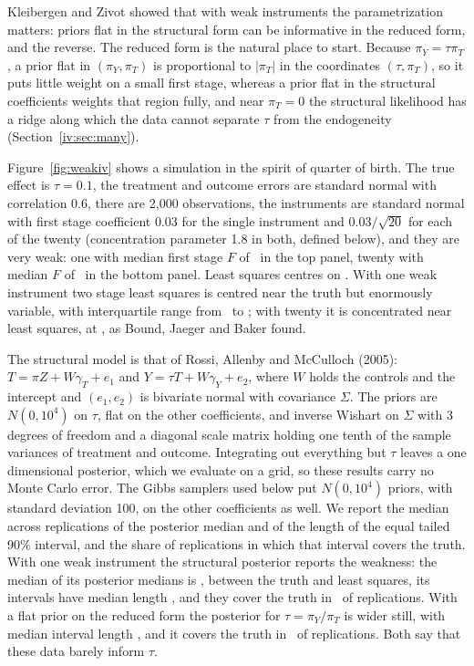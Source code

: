 Kleibergen and Zivot showed that with weak instruments the parametrization matters: priors flat in the structural form can be informative in the reduced form, and the reverse. The reduced form is the natural place to start. Because $\pi_Y = \tau\pi_T$, a prior flat in $(\pi_Y, \pi_T)$ is proportional to $|\pi_T|$ in the coordinates $(\tau, \pi_T)$, so it puts little weight on a small first stage, whereas a prior flat in the structural coefficients weights that region fully, and near $\pi_T = 0$ the structural likelihood has a ridge along which the data cannot separate $\tau$ from the endogeneity (Section~\ref{iv:sec:many}).

Figure~\ref{fig:weakiv} shows a simulation in the spirit of quarter of birth. The true effect is $\tau = 0.1$, the treatment and outcome errors are standard normal with correlation $0.6$, there are 2{,}000 observations, the instruments are standard normal with first stage coefficient $0.03$ for the single instrument and $0.03/\sqrt{20}$ for each of the twenty (concentration parameter 1.8 in both, defined below), and they are very weak: one with median first stage $F$ of \ivweakF\ in the top panel, twenty with median $F$ of \ivmanyF\ in the bottom panel. Least squares centres on \ivweakols. With one weak instrument two stage least squares is centred near the truth but enormously variable, with interquartile range from \ivweakiqrlo\ to \ivweakiqrhi; with twenty it is concentrated near least squares, at \ivmanytsls, as Bound, Jaeger and Baker found.

 The structural model is that of Rossi, Allenby and McCulloch (2005): $T = \pi Z + W\gamma_T + e_1$ and $Y = \tau T + W\gamma_Y + e_2$, where $W$ holds the controls and the intercept and $(e_1, e_2)$ is bivariate normal with covariance $\Sigma$. The priors are $N(0, 10^4)$ on $\tau$, flat on the other coefficients, and inverse Wishart on $\Sigma$ with 3 degrees of freedom and a diagonal scale matrix holding one tenth of the sample variances of treatment and outcome. Integrating out everything but $\tau$ leaves a one dimensional posterior, which we evaluate on a grid, so these results carry no Monte Carlo error. The Gibbs samplers used below put $N(0, 10^4)$ priors, with standard deviation 100, on the other coefficients as well. We report the median across replications of the posterior median and of the length of the equal tailed 90\% interval, and the share of replications in which that interval covers the truth. With one weak instrument the structural posterior reports the weakness: the median of its posterior medians is \ivweakbmed, between the truth and least squares, its intervals have median length \ivweakblen, and they cover the truth in \ivweakbcov\ of replications. With a flat prior on the reduced form the posterior for $\tau = \pi_Y/\pi_T$ is wider still, with median interval length \ivrflen, and it covers the truth in \ivrfcov\ of replications. Both say that these data barely inform $\tau$.

